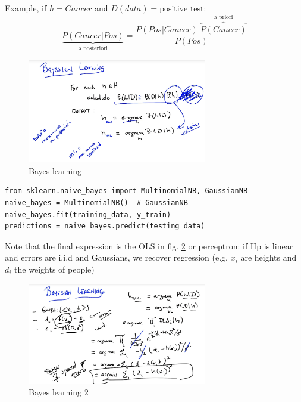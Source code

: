 \documentclass[11pt]{article}
\begin{document}
Example, if $h = Cancer$ and $D (data) = \text{positive test}$:
\[ \underbrace{P(Cancer|Pos)}_{\text{a posteriori}} = \frac{ P(Pos|Cancer) \; \overbrace{P(Cancer)}^{\text{a priori}} }{P(Pos)} 
\]
\begin{figure}[htbp] 
	\centering
	\includegraphics[width=0.7\textwidth]{pics/bayesian_learning}
	\caption{Bayes learning} 
	\label{bayesian_learning}
\end{figure}


\begin{lstlisting}
from sklearn.naive_bayes import MultinomialNB, GaussianNB
naive_bayes = MultinomialNB()  # GaussianNB
naive_bayes.fit(training_data, y_train)
predictions = naive_bayes.predict(testing_data)
\end{lstlisting}


Note that the final expression is the OLS in fig. \ref{bayesian_learning2} or perceptron: if Hp is linear and errors are i.i.d and Gaussians, we recover regression (e.g. $x_i$ are heights and $d_i$ the weights of people)

\begin{figure}[htbp] 
	\centering
	\includegraphics[width=0.7\textwidth]{pics/bayesian_learning_2}
	\caption{Bayes learning 2} 
	\label{bayesian_learning2}
\end{figure}
\end{document}
